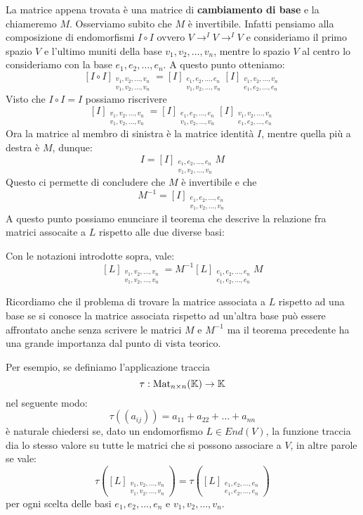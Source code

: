 La matrice appena trovata è una matrice di
\textbf{cambiamento di base} e la chiameremo $M$. Osserviamo subito che $M$ è
invertibile. Infatti pensiamo alla composizione di endomorfismi $I \circ I$
ovvero $V \to^{I} V \to^{I} V$ e consideriamo il primo spazio $V$ e l'ultimo muniti
della base $v_1, v_2, \dots, v_n$, mentre lo spazio $V$ al centro lo consideriamo
con la base $e_1, e_2, \dots, e_n$. A questo punto otteniamo:
\[
	[I \circ I]_{\substack{
	v_1, v_2, \dots, v_n \\
	v_1, v_2, \dots, v_n
}} =
		[I]_{\substack{
				e_1, e_2, \dots, e_n\\
				v_1, v_2, \dots, v_n
			}}
		[I]_{\substack{
				v_1, v_2, \dots, v_n\\
				e_1, e_2, \dots, e_n
			}}
\]
Visto che $I \circ I = I$ possiamo riscrivere
\[
	[I]_{\substack{
	v_1, v_2, \dots, v_n \\
	v_1, v_2, \dots, v_n
}} =
		[I]_{\substack{
				e_1, e_2, \dots, e_n\\
				v_1, v_2, \dots, v_n
			}}
		[I]_{\substack{
				v_1, v_2, \dots, v_n\\
				e_1, e_2, \dots, e_n
			}}
\]
Ora la matrice al membro di sinistra è la matrice identità $I$, mentre quella
più a destra è $M$, dunque:
\[
	I = [I]_{\substack{
		e_1, e_2, \dots, e_n\\
		v_1, v_2, \dots, v_n
	}} M
\]
Questo ci permette di concludere che $M$ è invertibile e che
\[
	M^{-1} = [I]_{\substack{
				e_1, e_2, \dots, e_n\\
				v_1, v_2, \dots, v_n
			}}
\]
A questo punto possiamo enunciare il teorema che descrive la relazione fra matrici
assocaite a $L$ rispetto alle due diverse basi:
\begin{theorem}
	Con le notazioni introdotte sopra, vale:
	\[
		[L]_{\substack{
					v_1, v_2, \dots, v_n \\
					v_1, v_2, \dots, v_n
				}} =
		M^{-1}[L]_{\substack{
					e_1, e_2, \dots, e_n\\
					e_1, e_2, \dots, e_n
				}}M
	\]
\end{theorem}

Ricordiamo che il problema di trovare la matrice associata a $L$ rispetto ad una
base se si conosce la matrice associata rispetto ad un'altra base può essere
affrontato anche senza scrivere le matrici $M$ e $M^{-1}$ ma il teorema precedente
ha una grande importanza dal punto di vista teorico.

Per esempio, se definiamo l'applicazione traccia
\[
	\tau : \operatorname{Mat}_{n \times n}(\mathbb{K}) \to \mathbb{K}
\]
nel seguente modo:
\[
	\tau((a_{ij})) = a_{11} + a_{22} + \dots + a_{nn}
\]
è naturale chiedersi se, dato un endomorfismo $L \in End(V)$, la funzione traccia
dia lo stesso valore su tutte le matrici che si possono associare a $V$, in altre
parole se vale:
\[
	\tau \left(
	[L]_{\substack{
			v_1, v_2, \dots, v_n \\
			v_1, v_2, \dots, v_n
		}}
	\right) =
	\tau \left(
	[L]_{\substack{
			e_1, e_2, \dots, e_n \\
			e_1, e_2, \dots, e_n
		}}
	\right)
\]
per ogni scelta delle basi $e_1, e_2, \dots, e_n$ e $v_1, v_2, \dots, v_n$.

